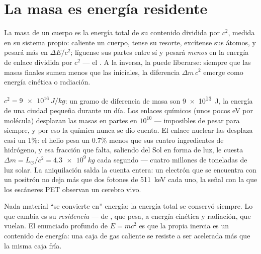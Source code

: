 \section{La masa es energía residente}

\begin{theorem}\label{thm:b3:relativistic-dynamics:emc2}
La masa de un cuerpo es la energía total de su contenido dividida por
$c^2$, medida en su sistema propio: caliente un cuerpo, tense su resorte,
excítense sus átomos, y pesará más en $\Delta E/c^2$; líguense sus partes entre
sí y pesará \emph{menos} en la energía de enlace dividida por $c^2$
--- el \emph{}. A la inversa, la  puede
liberarse: siempre que las masas finales sumen menos que las iniciales, la
diferencia $\Delta m\,c^2$ emerge como energía cinética o radiación.
\end{theorem}
\admitted

\begin{example}[La contabilidad de $c^2$]\label{ex:b3:relativistic-dynamics:ledger}
$c^2 = \qty{9e16}{J/kg}$: un gramo de diferencia de masa son
\qty{9e13}{J}, la energía de una ciudad pequeña durante un día. Los enlaces
químicos (unos pocos eV por molécula) desplazan las masas en partes en
$10^{10}$ --- imposibles de pesar para siempre, y por eso la química nunca
se dio cuenta. El enlace nuclear las desplaza casi un $1\%$: el helio pesa
un $0.7\%$ menos que sus cuatro ingredientes de hidrógeno, y esa fracción
que falta, saliendo del Sol en forma de luz, le cuesta $\Delta m = L_\odot/c^2 =
\qty{4.3e9}{kg}$ cada segundo --- cuatro millones de toneladas de luz solar.
La aniquilación salda la cuenta entera: un electrón que se encuentra con un
positrón no deja más que dos fotones de \qty{511}{keV} cada uno, la señal
con la que los escáneres PET observan un cerebro vivo.
\end{example}

\begin{remark}\label{rem:b3:relativistic-dynamics:conversion}
Nada material ``se convierte en'' energía: la energía total se conservó
siempre. Lo que cambia es su \emph{residencia} --- de , que
pesa, a energía cinética y radiación, que vuelan. El enunciado profundo de
$E = mc^2$ es que la propia inercia es un contenido de energía: una caja de
gas caliente se resiste a ser acelerada más que la misma caja fría.
\end{remark}

